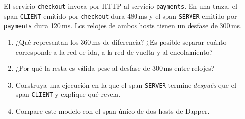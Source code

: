 \documentclass[variant=guia,cover=institutional,mode=screen]{ua-engineering-v6-article}
\begin{document}
\begin{uaexercise}
El servicio \texttt{checkout} invoca por HTTP al servicio \texttt{payments}. En una traza, el span \texttt{CLIENT} emitido por \texttt{checkout} dura 480\,ms y el span \texttt{SERVER} emitido por \texttt{payments} dura 120\,ms. Los relojes de ambos hosts tienen un desfase de 300\,ms.
\begin{enumerate}
\item ¿Qué representan los 360\,ms de diferencia? ¿Es posible separar cuánto corresponde a la red de ida, a la red de vuelta y al encolamiento?
\item ¿Por qué la resta es válida pese al desfase de 300\,ms entre relojes?
\item Construya una ejecución en la que el span \texttt{SERVER} termine \emph{después} que el span \texttt{CLIENT} y explique qué revela.
\item Compare este modelo con el span único de dos hosts de Dapper.
\end{enumerate}
\end{uaexercise}
\end{document}

